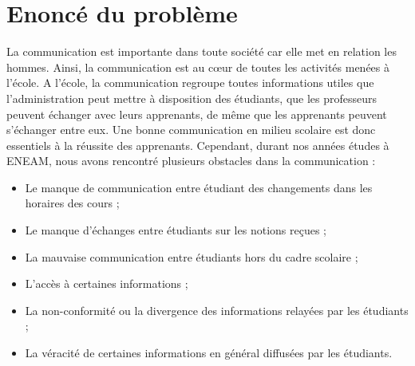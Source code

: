\documentclass[a4paper,12pt,french]{report} %
\begin{document}
\section{Enoncé du problème}
La communication est importante dans toute société car elle met en relation les hommes. Ainsi, la communication est au c\oe{}ur de toutes les activités menées à l’école. A l’école, la communication regroupe toutes informations utiles que l'administration peut mettre à disposition des étudiants, que les professeurs peuvent échanger avec leurs apprenants, de même que les apprenants peuvent s'échanger entre eux. Une bonne communication en milieu scolaire est donc essentiels à la réussite des apprenants. Cependant, durant nos années études à ENEAM, nous avons rencontré plusieurs obstacles dans la communication :
\begin{itemize}
	\item Le manque de communication entre étudiant des changements dans les horaires des cours ; 
	\item Le manque d’échanges entre étudiants sur les notions reçues ; 
	\item La mauvaise communication entre étudiants hors du cadre scolaire ;
	\item L’accès à certaines informations ; 
	\item La non-conformité ou la divergence des informations relayées par les étudiants ;
	\item La véracité de certaines informations en général diffusées par les étudiants.
\end{itemize}
	
\end{document}
